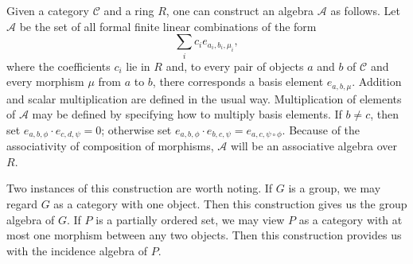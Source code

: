 \documentclass[12pt]{article}
\begin{document}
Given a category $\mathcal{C}$ and a ring $R$, one can construct an
algebra $\mathcal{A}$ as follows. Let $\mathcal{A}$ be the set of
all formal finite linear combinations of the form
\[\sum_i c_i e_{a_i, b_i, \mu_i},\]
where the coefficients $c_i$ lie in $R$ and, to every pair of objects
$a$ and $b$ of $\mathcal{C}$ and every morphism $\mu$ from $a$ to $b$,
there corresponds a basis element $e_{a,b,\mu}$. Addition and scalar
multiplication are defined in the usual way. Multiplication of
elements of $\mathcal{A}$ may be defined by specifying how to multiply
basis elements. If $b \not= c$, then set $e_{a, b, \phi} \cdot
e_{c, d, \psi} = 0$; otherwise set $e_{a, b, \phi} \cdot e_{b, c, \psi}
= e_{a, c, \psi \circ \phi}$. Because of the associativity of
composition of morphisms, $\mathcal{A}$ will be an associative algebra
over $R$.

Two instances of this construction are worth noting.  If $G$ is a group,
we may regard $G$ as a category with one object.  Then this construction 
gives us the group algebra of $G$.  If $P$ is a partially ordered set,
we may view $P$ as a category with at most one morphism between any
two objects.  Then this construction provides us with the incidence 
algebra of $P$.
\end{document}

